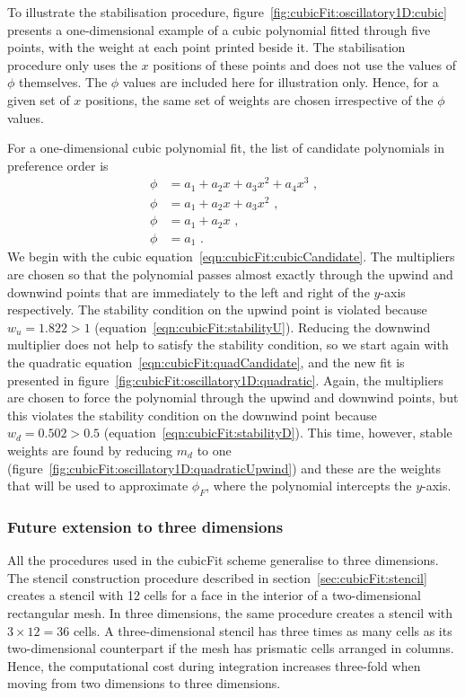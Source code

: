 To illustrate the stabilisation procedure, figure~\ref{fig:cubicFit:oscillatory1D:cubic} presents a one-dimensional example of a cubic polynomial fitted through five points, with the weight at each point printed beside it.
The stabilisation procedure only uses the $x$ positions of these points and does not use the values of $\phi$ themselves.  The $\phi$ values are included here for illustration only.
Hence, for a given set of $x$ positions, the same set of weights are chosen irrespective of the $\phi$ values.

For a one-dimensional cubic polynomial fit, the list of candidate polynomials in preference order is
\begin{align}
	\phi &= a_1 + a_2 x + a_3 x^2 + a_4 x^3 \label{eqn:cubicFit:cubicCandidate} \text{ ,} \\
	\phi &= a_1 + a_2 x + a_3 x^2 \label{eqn:cubicFit:quadCandidate} \text{ ,} \\
	\phi &= a_1 + a_2 x \text{ ,} \\
	\phi &= a_1 \text{ .}
\end{align}
We begin with the cubic equation~\eqref{eqn:cubicFit:cubicCandidate}.  The multipliers are chosen so that the polynomial passes almost exactly through the upwind and downwind points that are immediately to the left and right of the $y$-axis respectively.
The stability condition on the upwind point is violated because $w_u = 1.822 > 1$ (equation~\ref{eqn:cubicFit:stabilityU}).  Reducing the downwind multiplier does not help to satisfy the stability condition, so we start again with the quadratic equation~\eqref{eqn:cubicFit:quadCandidate}, and the new fit is presented in figure~\ref{fig:cubicFit:oscillatory1D:quadratic}.
Again, the multipliers are chosen to force the polynomial through the upwind and downwind points, but this violates the stability condition on the downwind point because $w_d = 0.502 > 0.5$ (equation~\ref{eqn:cubicFit:stabilityD}).  This time, however, stable weights are found by reducing $m_d$ to one (figure~\ref{fig:cubicFit:oscillatory1D:quadraticUpwind}) and these are the weights that will be used to approximate $\phi_F$, where the polynomial intercepts the $y$-axis.

\subsubsection{Future extension to three dimensions}
All the procedures used in the cubicFit scheme generalise to three dimensions.  The stencil construction procedure described in section~\ref{sec:cubicFit:stencil} creates a stencil with \num{12} cells for a face in the interior of a two-dimensional rectangular mesh.  In three dimensions, the same procedure creates a stencil with $3 \times 12 = 36$ cells.
A three-dimensional stencil has three times as many cells as its two-dimensional counterpart if the mesh has prismatic cells arranged in columns.  Hence, the computational cost during integration increases three-fold when moving from two dimensions to three dimensions.

